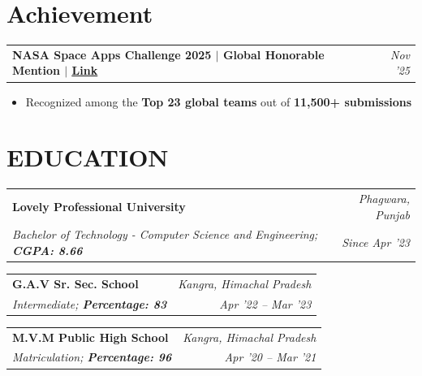 \documentclass[a4paper, 10pt]{article}
\makeatletter
\newcommand{\cvlink}[2]{\href{#1}{\textcolor{headerblue}{\uline{#2}}}}
\newcommand{\entry}[4]{
    \noindent\begin{tabularx}{\linewidth}{@{} X r @{}}
        \textbf{\color{headerblue}#1} & \textit{#2} \\
        \textit{#3} & \textit{#4} \\
    \end{tabularx}
}
\newcommand{\projectentry}[2]{
    \noindent\begin{tabularx}{\linewidth}{@{} X r @{}}
        \textbf{\color{headerblue}#1} & \textit{#2} \\
    \end{tabularx}
    \par\vspace{2pt}
}
\makeatother
\begin{document}

\section*{Achievement}

\projectentry{\textbf{NASA Space Apps Challenge 2025} $|$ Global Honorable Mention $|$ \cvlink{https://drive.google.com/file/d/1RZ63Tk5zmSds2Rza-F8y-gWo6T2NvS6H/view?usp=sharing}{Link}}{Nov '25}

\begin{itemize}


\item Recognized among the \textbf{Top 23 global teams} out of \textbf{11,500+ submissions}

\end{itemize}







\section*{EDUCATION}

\entry{Lovely Professional University}{Phagwara, Punjab}{Bachelor of Technology - Computer Science and Engineering; \textbf{CGPA: 8.66}}{Since Apr '23}

\entry{G.A.V Sr. Sec. School}{Kangra, Himachal Pradesh}{Intermediate; \textbf{Percentage: 83}}{Apr '22 – Mar '23}

\entry{M.V.M Public High School}{Kangra, Himachal Pradesh}{Matriculation; \textbf{Percentage: 96}}{Apr '20 – Mar '21}
\end{document}
